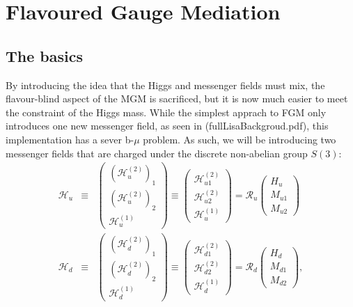 \chapter{Flavoured Gauge Mediation}
\section{The basics}
By introducing the idea that the Higgs and messenger fields must mix, the flavour-blind aspect of the MGM is sacrificed, but it is now much easier to meet the constraint of the Higgs mass. While the simplest apprach to FGM only introduces one new messenger field, as seen  in (fullLisaBackgroud.pdf), this implementation has a sever b-$\mu$ problem. As such, we will be introducing two messenger fields that are charged under the discrete non-abelian group $S(3)$:
\begin{eqnarray}
\mathcal{H}_{u}&\equiv&  \left (\begin{array}{c} (\mathcal{H}^{(2)}_u)_1 \\ (\mathcal{H}^{(2)}_u)_2 \\ \mathcal{H}^{(1)}_u \end{array} \right )  \equiv  \left (\begin{array}{c} \mathcal{H}^{(2)}_{u1}\\ \mathcal{H}^{(2)}_{u2}\\ \mathcal{H}^{(1)}_u\end{array} \right )= \mathcal{R}_u \left (\begin{array}{c} H_u\\M_{u1} \\  M_{u2} \end{array} \right ) \nonumber \\
\mathcal{H}_{d}&\equiv& \left (\begin{array}{c} (\mathcal{H}^{(2)}_d)_1 \\ (\mathcal{H}^{(2)}_d)_2 \\ \mathcal{H}^{(1)}_d \end{array} \right ) \equiv  \left (\begin{array}{c} \mathcal{H}^{(2)}_{d1}\\ \mathcal{H}^{(2)}_{d2}\\ \mathcal{H}^{(1)}_d\end{array} \right )=\mathcal{R}_d \left (\begin{array}{c} H_d\\M_{d1}  \\ M_{d2} \end{array} \right ),
\label{higgs_s3}
\end{eqnarray}

